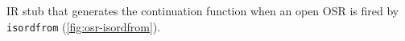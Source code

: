 \label{fig:osr-isordstub} IR stub that generates the continuation function when an open OSR is fired by {\tt isordfrom} (\myfigure\ref{fig:osr-isordfrom}).
